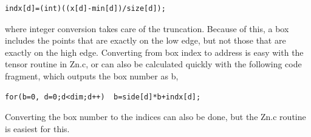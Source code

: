 \documentclass {scrbook}
\begin{document}
\begin{lstlisting}
indx[d]=(int)((x[d]-min[d])/size[d]);
\end{lstlisting}

where integer conversion takes care of the truncation. Because of this, a box includes the points that are exactly on the low edge, but not those that are exactly on the high edge. Converting from box index to address is easy with the tensor routine in Zn.c, or can also be calculated quickly with the following code fragment, which outputs the box number as b, 

\begin{lstlisting}
for(b=0, d=0;d<dim;d++)  b=side[d]*b+indx[d];
\end{lstlisting}

Converting the box number to the indices can also be done, but the Zn.c routine is easiest for this.
\end{document}
